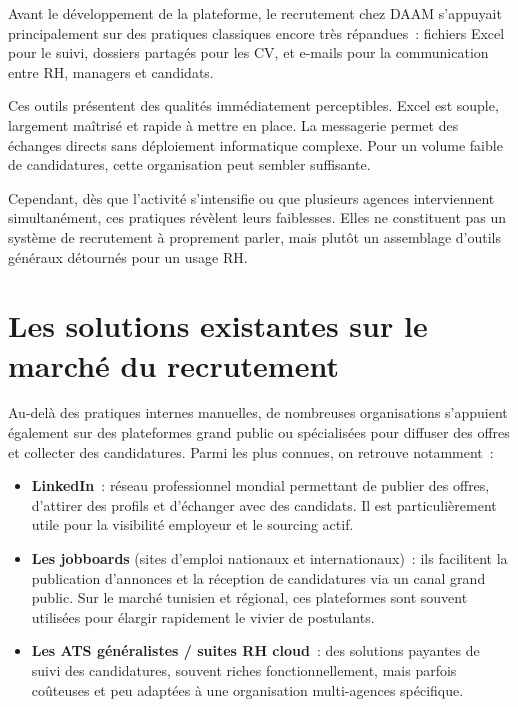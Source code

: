 Avant le développement de la plateforme, le recrutement chez DAAM s'appuyait
principalement sur des pratiques classiques encore très répandues~: fichiers
Excel pour le suivi, dossiers partagés pour les CV, et e-mails pour la
communication entre RH, managers et candidats.

Ces outils présentent des qualités immédiatement perceptibles. Excel est
souple, largement maîtrisé et rapide à mettre en place. La messagerie permet
des échanges directs sans déploiement informatique complexe. Pour un volume
faible de candidatures, cette organisation peut sembler suffisante.

Cependant, dès que l'activité s'intensifie ou que plusieurs agences
interviennent simultanément, ces pratiques révèlent leurs faiblesses. Elles
ne constituent pas un système de recrutement à proprement parler, mais plutôt
un assemblage d'outils généraux détournés pour un usage RH.


\section{Les solutions existantes sur le marché du recrutement}

Au-delà des pratiques internes manuelles, de nombreuses organisations
s'appuient également sur des plateformes grand public ou spécialisées pour
diffuser des offres et collecter des candidatures. Parmi les plus connues,
on retrouve notamment~:

\begin{itemize}
  \item \textbf{LinkedIn}~: réseau professionnel mondial permettant de publier
        des offres, d'attirer des profils et d'échanger avec des candidats.
        Il est particulièrement utile pour la visibilité employeur et le
        sourcing actif.
  \item \textbf{Les jobboards} (sites d'emploi nationaux et internationaux)~:
        ils facilitent la publication d'annonces et la réception de candidatures
        via un canal grand public. Sur le marché tunisien et régional, ces
        plateformes sont souvent utilisées pour élargir rapidement le vivier
        de postulants.
  \item \textbf{Les ATS généralistes / suites RH cloud}~: des solutions
        payantes de suivi des candidatures, souvent riches fonctionnellement,
        mais parfois coûteuses et peu adaptées à une organisation multi-agences
        spécifique.
\end{itemize}

